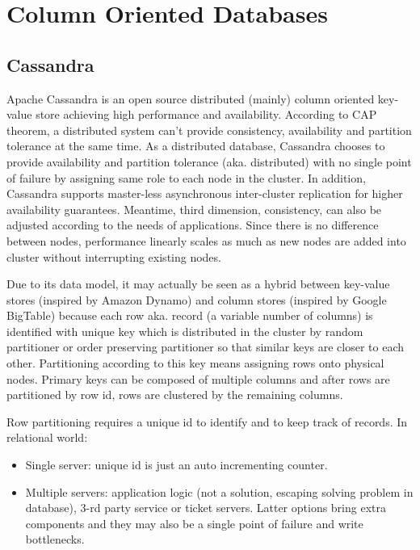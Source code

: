 \section{Column Oriented Databases}

\subsection{Cassandra}

Apache Cassandra is an open source distributed (mainly) column oriented key-value store achieving high performance and availability. According to CAP theorem, a distributed system can't provide consistency, availability and partition tolerance at the same time. As a distributed database, Cassandra chooses to provide availability and partition tolerance (aka. distributed) with no single point of failure by assigning same role to each node in the cluster. In addition, Cassandra supports master-less asynchronous inter-cluster replication for higher availability guarantees. Meantime, third dimension, consistency, can also be adjusted according to the needs of applications. Since there is no difference between nodes, performance linearly scales as much as new nodes are added into cluster without interrupting existing nodes.

Due to its data model, it may actually be seen as a hybrid between key-value stores (inspired by Amazon Dynamo) and column stores (inspired by Google BigTable) because each row aka. record (a variable number of columns) is identified with unique key which is distributed in the cluster by random partitioner or order preserving partitioner so that similar keys are closer to each other. Partitioning according to this key means assigning rows onto physical nodes. Primary keys can be composed of multiple columns and after rows are partitioned by row id, rows are clustered by the remaining columns.

Row partitioning requires a unique id to identify and to keep track of records. In relational world:
\begin{itemize}
  \item Single server: unique id is just an auto incrementing counter.
  \item Multiple servers: application logic (not a solution, escaping solving problem in database), 3-rd party service or ticket servers. Latter options bring extra components and they may also be a single point of failure and write bottlenecks.
\end{itemize}

